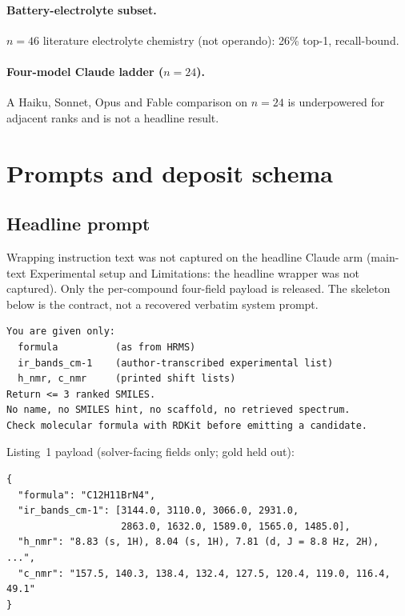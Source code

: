 \documentclass[11pt]{article}
\newcounter{listing}
\begin{document}
\paragraph{Battery-electrolyte subset.}
$n{=}46$ literature electrolyte chemistry (not operando): 26\% top-1,
recall-bound.

\paragraph{Four-model Claude ladder ($n{=}24$).}
A Haiku, Sonnet, Opus and Fable comparison on $n{=}24$ is underpowered
for adjacent ranks and is not a headline result.

\section{Prompts and deposit schema}
\label{si:prompt}

\subsection{Headline prompt}

Wrapping instruction text was not captured on the headline Claude arm
(main-text Experimental setup and Limitations: the headline wrapper
was not captured).
Only the per-compound four-field payload is released.
The skeleton below is the contract, not a recovered verbatim system prompt.

\begin{lstlisting}[style=prompt]
You are given only:
  formula          (as from HRMS)
  ir_bands_cm-1    (author-transcribed experimental list)
  h_nmr, c_nmr     (printed shift lists)
Return <= 3 ranked SMILES.
No name, no SMILES hint, no scaffold, no retrieved spectrum.
Check molecular formula with RDKit before emitting a candidate.
\end{lstlisting}

Listing~1 payload (solver-facing fields only; gold held out):

\begin{lstlisting}[style=irexpjson]
{
  "formula": "C12H11BrN4",
  "ir_bands_cm-1": [3144.0, 3110.0, 3066.0, 2931.0,
                    2863.0, 1632.0, 1589.0, 1565.0, 1485.0],
  "h_nmr": "8.83 (s, 1H), 8.04 (s, 1H), 7.81 (d, J = 8.8 Hz, 2H), ...",
  "c_nmr": "157.5, 140.3, 138.4, 132.4, 127.5, 120.4, 119.0, 116.4, 49.1"
}
\end{lstlisting}
\end{document}
